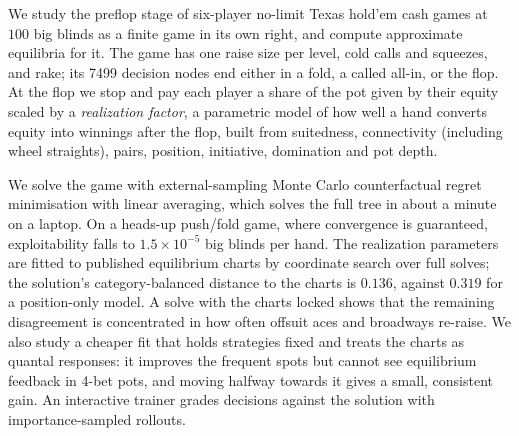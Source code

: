 We study the preflop stage of six-player no-limit Texas hold'em cash games at $100$ big blinds as a finite game in its own right, and compute approximate equilibria for it. The game has one raise size per level, cold calls and squeezes, and rake; its \num{7499} decision nodes end either in a fold, a called all-in, or the flop. At the flop we stop and pay each player a share of the pot given by their equity scaled by a \emph{realization factor}, a parametric model of how well a hand converts equity into winnings after the flop, built from suitedness, connectivity (including wheel straights), pairs, position, initiative, domination and pot depth.

We solve the game with external-sampling Monte Carlo counterfactual regret minimisation with linear averaging, which solves the full tree in about a minute on a laptop. On a heads-up push/fold game, where convergence is guaranteed, exploitability falls to $1.5\times 10^{-5}$ big blinds per hand. The realization parameters are fitted to published equilibrium charts by coordinate search over full solves; the solution's category-balanced distance to the charts is $0.136$, against $0.319$ for a position-only model. A solve with the charts locked shows that the remaining disagreement is concentrated in how often offsuit aces and broadways re-raise. We also study a cheaper fit that holds strategies fixed and treats the charts as quantal responses: it improves the frequent spots but cannot see equilibrium feedback in 4-bet pots, and moving halfway towards it gives a small, consistent gain. An interactive trainer grades decisions against the solution with importance-sampled rollouts.
